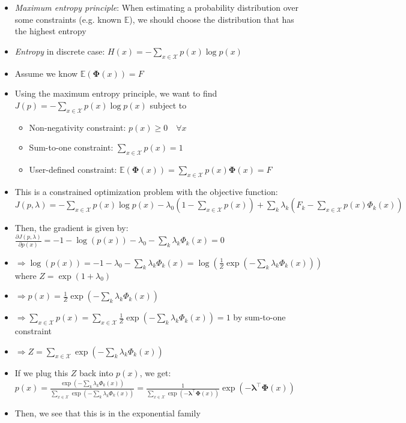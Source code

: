 \begin{itemize}
    \item \emph{Maximum entropy principle}: When estimating a probability distribution over some constraints (e.g. known $\mathbb{E}$), we should choose the distribution that has the highest entropy
    \item \emph{Entropy} in discrete case:
    $
    H(x) = -\sum_{x \in \mathcal{X}} p(x) \log p(x)
    $
    \item Assume we know $\mathbb{E}(\boldsymbol{\Phi}(x)) = F$
    \item Using the maximum entropy principle, we want to find $J(p) = -\sum_{x \in \mathcal{X}} p(x) \log p(x)$ subject to
    \begin{itemize}
        \item Non-negativity constraint: $p(x) \geq 0 \quad \forall x$
        \item Sum-to-one constraint: $\sum_{x \in \mathcal{X}} p(x) = 1$
        \item User-defined constraint: $\mathbb{E}(\boldsymbol{\Phi}(x)) = \sum_{x \in \mathcal{X}} p(x) \boldsymbol{\Phi}(x) = F$
    \end{itemize}
    \item This is a constrained optimization problem with the objective function: $
    J(p, \lambda) = -\sum_{x \in \mathcal{X}} p(x) \log p(x) - \lambda_0 \left(1 - \sum_{x \in \mathcal{X}} p(x)\right) + \sum_k \lambda_k \left(F_k - \sum_{x \in \mathcal{X}} p(x) \Phi_k(x)\right)
    $
    \item Then, the gradient is given by:
    $
    \frac{\partial J(p, \lambda)}{\partial p(x)} = -1 - \log(p(x)) - \lambda_0 - \sum_k \lambda_k \Phi_k(x) = 0
    $
    \item $\Rightarrow \log(p(x)) = -1 - \lambda_0 - \sum_k \lambda_k \Phi_k(x) = \log(\frac{1}{Z} \exp\left(-\sum_k \lambda_k \Phi_k(x)\right))$ where $Z = \exp(1 + \lambda_0)$
    \item $\Rightarrow p(x) = \frac{1}{Z} \exp\left(-\sum_k \lambda_k \Phi_k(x)\right)$
    \item $\Rightarrow
    \sum_{x \in \mathcal{X}} p(x) = \sum_{x \in \mathcal{X}} \frac{1}{Z} \exp\left(-\sum_k \lambda_k \Phi_k(x)\right) = 1
    $ by sum-to-one constraint
    \item $\Rightarrow
    Z = \sum_{x \in \mathcal{X}} \exp\left(-\sum_k \lambda_k \Phi_k(x)\right)$
    \item If we plug this $Z$ back into $p(x)$, we get:
    $
    p(x) = \frac{\exp\left(-\sum_k \lambda_k \Phi_k(x)\right)}{\sum_{x \in \mathcal{X}} \exp\left(-\sum_k \lambda_k \Phi_k(x)\right)} = \frac{1}{\sum_{x \in \mathcal{X}} \exp\left(-\boldsymbol{\lambda}^\intercal \boldsymbol{\Phi}(x)\right)} \exp\left(-\boldsymbol{\lambda}^\intercal \boldsymbol{\Phi}(x)\right)
    $
    \item Then, we see that this is in the exponential family
\end{itemize}
